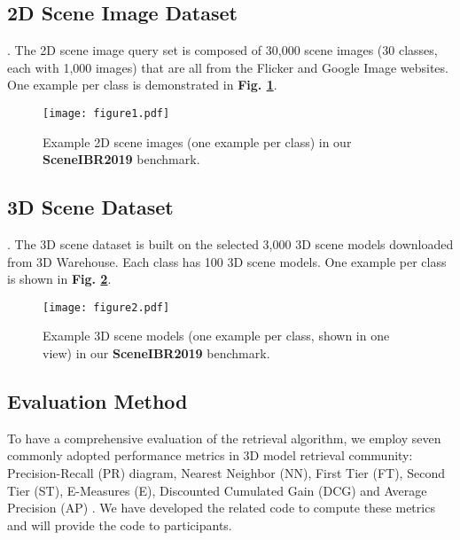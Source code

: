 \documentclass[../main.tex]{subfiles}
\begin{document}
\subsection{2D Scene Image Dataset}. The 2D scene image query set is composed of 30,000 scene images (30 classes, each with 1,000 images) that are all from the Flicker and Google Image websites. One example per class is demonstrated in \textbf{Fig. \ref{fig:1}}.

\begin{figure}[!htp]
	\centering
	\texttt{[image: figure1.pdf]}
	\caption{Example 2D scene images (one example per class) in our \textbf{SceneIBR2019} benchmark.}
	\label{fig:1}
\end{figure}

\subsection{3D Scene Dataset}. The 3D scene dataset is built on the selected 3,000 3D scene models downloaded from 3D Warehouse. Each class has 100 3D scene models. One example per class is shown in \textbf{Fig. \ref{fig:2}}.

\begin{figure}[!htp]
	\centering
	\texttt{[image: figure2.pdf]}
	\caption{Example 3D scene models (one example per class, shown in one view) in our \textbf{SceneIBR2019} benchmark.}
	\label{fig:2}
\end{figure}

\subsection{Evaluation Method}
To have a comprehensive evaluation of the retrieval algorithm, we employ seven commonly adopted performance metrics in 3D model retrieval community: Precision-Recall (PR) diagram, Nearest Neighbor (NN), First Tier (FT), Second Tier (ST), E-Measures (E), Discounted Cumulated Gain (DCG) and Average Precision (AP) \cite{CIVU}. We have developed the related code to compute these metrics and will provide the code to participants. 
\end{document}
